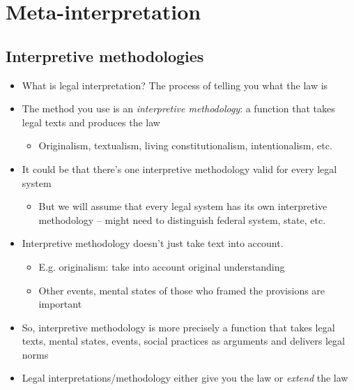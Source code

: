 \hypertarget{meta-interpretation}{%
\section{Meta-interpretation}\label{meta-interpretation}}

\hypertarget{interpretive-methodologies}{%
\subsection{Interpretive
methodologies}\label{interpretive-methodologies}}

\begin{itemize}
\tightlist
\item
  What is legal interpretation? The process of telling you what the law
  is
\item
  The method you use is an \emph{interpretive methodology}: a function
  that takes legal texts and produces the law

  \begin{itemize}
  \tightlist
  \item
    Originalism, textualism, living constitutionalism, intentionalism,
    etc.
  \end{itemize}
\item
  It could be that there's one interpretive methodology valid for every
  legal system

  \begin{itemize}
  \tightlist
  \item
    But we will assume that every legal system has its own interpretive
    methodology -- might need to distinguish federal system, state, etc.
  \end{itemize}
\item
  Interpretive methodology doesn't just take text into account.

  \begin{itemize}
  \tightlist
  \item
    E.g. originalism: take into account original understanding
  \item
    Other events, mental states of those who framed the provisions are
    important
  \end{itemize}
\item
  So, interpretive methodology is more precisely a function that takes
  legal texts, mental states, events, social practices as arguments and
  delivers legal norms
\item
  Legal interpretations/methodology either give you the law or
  \emph{extend} the law


\end{itemize}
